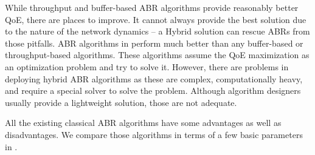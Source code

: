 While throughput and buffer-based ABR algorithms provide reasonably better QoE, there are places to improve. It cannot always provide the best solution due to the nature of the network dynamics -- a Hybrid solution can rescue ABRs from those pitfalls. ABR algorithms in \cite{7247436,140405,yin2015control,10.1145/2670518.2673877} perform much better than any buffer-based or throughput-based algorithms. These algorithms assume the QoE maximization as an optimization problem and try to solve it. However, there are problems in deploying hybrid ABR algorithms as these are complex, computationally heavy, and require a special solver to solve the problem. Although algorithm designers usually provide a lightweight solution, those are not adequate.

All the existing classical ABR algorithms have some advantages as well as disadvantages. We compare those algorithms in terms of a few basic parameters in \tbl{\ref{chap02:tbl:comparison_classical}}.


